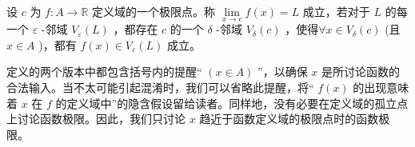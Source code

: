 \addtocounter{Thm}{-1}


\begin{Def}[拓扑版本]
设 \(c\) 为 \(f : A \rightarrow  \mathbb{R}\) 定义域的一个极限点。称 \(\mathop{\lim }\limits_{{x \rightarrow  c}}f\left( x\right)  = L\) 成立，若对于 \(L\) 的每一个 \(\varepsilon\) -邻域 \({V}_{\varepsilon }\left( L\right)\) ，都存在 \(c\) 的一个 \(\delta\) -邻域 \({V}_{\delta }\left( c\right)\) ，使得\(\forall x \in  {V}_{\delta }\left( c\right)\) (且 \(x \in  A\) )，都有 \(f\left( x\right)  \in  {V}_{\varepsilon }\left( L\right)\) 成立。  
\end{Def}


定义的两个版本中都包含括号内的提醒“ \(\left( {x \in  A}\right)\) ”，以确保 \(x\) 是所讨论函数的合法输入。当不太可能引起混淆时，我们可以省略此提醒，将“ \(f\left( x\right)\) 的出现意味着 \(x\) 在 \(f\) 的定义域中”的隐含假设留给读者。同样地，没有必要在定义域的孤立点上讨论函数极限。因此，我们只讨论 \(x\) 趋近于函数定义域的极限点时的函数极限。



